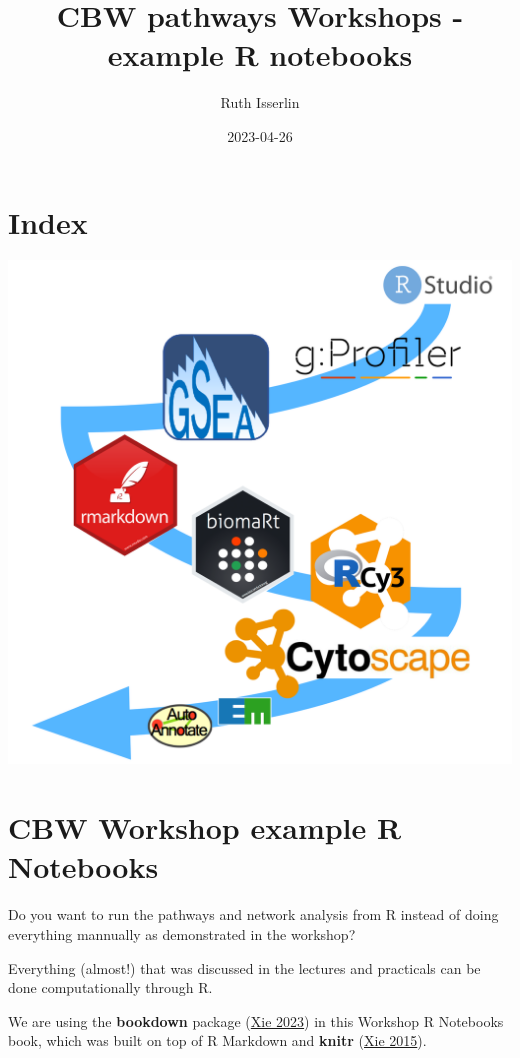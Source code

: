 \documentclass[
]{book}
\title{CBW pathways Workshops - example R notebooks}
\author{Ruth Isserlin}
\date{2023-04-26}
\begin{document}
\maketitle

{
\setcounter{tocdepth}{1}
\tableofcontents
}
\hypertarget{index}{%
\chapter{Index}\label{index}}

\includegraphics{./images/cover.png}

\hypertarget{intro}{%
\chapter{CBW Workshop example R Notebooks}\label{intro}}

Do you want to run the pathways and network analysis from R instead of doing everything mannually as demonstrated in the workshop?

Everything (almost!) that was discussed in the lectures and practicals can be done computationally through R.

We are using the \textbf{bookdown} package (\protect\hyperlink{ref-R-bookdown}{Xie 2023}) in this Workshop R Notebooks book, which was built on top of R Markdown and \textbf{knitr} (\protect\hyperlink{ref-xie2015}{Xie 2015}).
\end{document}
